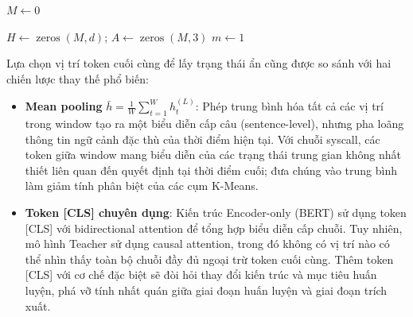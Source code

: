 \documentclass[../main.tex]{subfiles}
\begin{document}
\begin{algorithm}[H]
  \caption{Trích xuất hidden states của Transformer làm đầu vào cho
  K-Means}
  \label{alg:extract_hidden_states_for_kmeans}
  \SetAlgoLined
  \DontPrintSemicolon

  $M \gets 0$\;

  $H \gets \operatorname{zeros}(M,d)$;\quad
  $A \gets \operatorname{zeros}(M,3)$\;
  $m \gets 1$\;
  \;
\end{algorithm}

Lựa chọn vị trí token cuối cùng để lấy trạng thái ẩn cũng được so sánh với hai
chiến lược thay thế phổ biến:

\begin{itemize}
  \item \textbf{Mean pooling} $\bar{h} = \frac{1}{W}\sum_{t=1}^{W}
    h_t^{(L)}$: Phép
    trung bình hóa tất cả các vị trí trong window tạo ra một biểu diễn cấp câu
    (sentence-level), nhưng pha loãng thông tin ngữ cảnh đặc thù của
    thời điểm hiện
    tại. Với chuỗi \gls{syscall}, các token giữa window mang biểu diễn của
    các trạng thái
    trung gian không nhất thiết liên quan đến quyết định tại thời
    điểm cuối; đưa chúng
    vào trung bình làm giảm tính phân biệt của các cụm K-Means.
  \item \textbf{Token [CLS] chuyên dụng}: Kiến trúc Encoder-only (BERT) sử dụng
    token [CLS] với bidirectional attention để tổng hợp biểu diễn cấp chuỗi. Tuy
    nhiên, mô hình Teacher sử dụng causal attention, trong đó không
    có vị trí nào
    có thể nhìn thấy toàn bộ chuỗi đầy đủ ngoại trừ token cuối cùng. Thêm token
    [CLS] với cơ chế đặc biệt sẽ đòi hỏi thay đổi kiến trúc và mục tiêu huấn
    luyện, phá vỡ tính nhất quán giữa giai đoạn huấn luyện và giai
    đoạn trích xuất.
\end{itemize}
\end{document}
